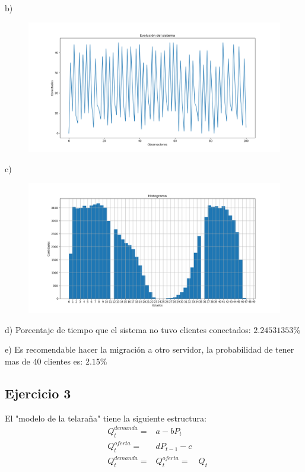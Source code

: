 \documentclass[11pt,a4paper]{article}
\begin{document}
		b)  
	     \begin{figure}[H]
  			\centering
    			\includegraphics[width=18cm]{imagenes/conectadosObservacionesEJ2}
		\end{figure}


		c)  
	     \begin{figure}[H]
  			\centering
    			\includegraphics[width=18cm]{imagenes/histogramaEj2}
		\end{figure}
		
		d) Porcentaje de tiempo que el sistema no tuvo clientes conectados: $2.24531353$\%
		
		e) Es recomendable hacer la migración a otro servidor, la probabilidad de tener mas de 40 clientes es: $2.15$\%
\newpage
		
	\subsection{Ejercicio 3}
		El "modelo de la telaraña" tiene la siguiente estructura:
		\begin{equation}
			\begin{array}{llllll}
				&Q_t^{demanda} = & a - bP_t \\
				&Q_t^{oferta} = & dP_{t-1} - c \\
				&Q_t^{demanda} = &Q_t^{oferta}  = &Q_t
			\end{array}
		\end{equation}
		
\end{document}
